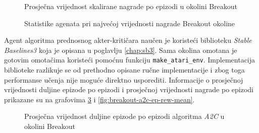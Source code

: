 \begin{figure}[H]
    \centering
    \caption{Prosječna vrijednost skalirane nagrade po epizodi u okolini Breakout}
    \label{fig:breakout-avg-rew}
\end{figure}

\begin{figure}[H]
    \centering
    \caption{Statistike agenata pri najvećoj vrijednosti nagrade Breakout okoline}
    \label{fig:breakout-stats}
\end{figure}

Agent algoritma prednosnog akter-kritičara naučen je koristeći biblioteku \textit{Stable Baselines3} koja je opisana u poglavlju \ref{chap:sb3}. Sama okolina omotana je gotovim omotačima koristeći pomoćnu funkciju \texttt{make_atari_env}. Implementacija biblioteke razlikuje se od prethodno opisane ručne implementacije i zbog toga performanse učenja nije moguće direktno usporediti. Informacije o prosječnoj vrijednosti duljine epizode po epizodi i prosječnoj vrijednosti nagrade po epizodi prikazane su na grafovima \ref{fig:breakout-a2c-ep-len-mean} i \ref{fig:breakout-a2c-ep-rew-mean}.

\begin{figure}[H]
    \centering
    \caption{Prosječna vrijednost duljine epizode po epizodi algoritma \textit{A2C} u okolini Breakout}
    \label{fig:breakout-a2c-ep-len-mean}
\end{figure}

